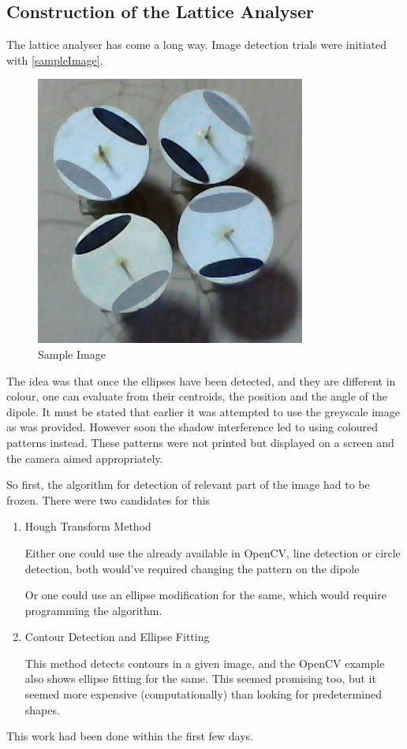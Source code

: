 	\subsection{Construction of the Lattice Analyser}
		The lattice analyser has come a long way. Image detection trials were initiated with \autoref{sampleImage}. 
		\begin{figure}[bth]
			\begin{center}
				\includegraphics[width=0.7\linewidth]{../../latticeAnalyser/picture002.jpg}
			\end{center}
		\caption[Sample Image]{Sample Image}
		\label{sampleImage}
		\end{figure}

		The idea was that once the ellipses have been detected, and they are different in colour, one can evaluate from their centroids, the position and the angle of the dipole. It must be stated that earlier it was attempted to use the greyscale image as was provided. However soon the shadow interference led to using coloured patterns instead. These patterns were not printed but displayed on a screen and the camera aimed appropriately.
		\par
		So first, the algorithm for detection of relevant part of the image had to be frozen. There were two candidates for this
		\begin{enumerate}
			\item Hough Transform Method
				\par
				Either one could use the already available in OpenCV, line detection or circle detection, both would've required changing the pattern on the dipole
				\par
				Or one could use an ellipse modification for the same, which would require programming the algorithm.
			\item Contour Detection and Ellipse Fitting
				\par
				This method detects contours in a given image, and the OpenCV example also shows ellipse fitting for the same. This seemed promising too, but it seemed more expensive (computationally) than looking for predetermined shapes.
		\end{enumerate}
		This work had been done within the first few days. 
		\par

